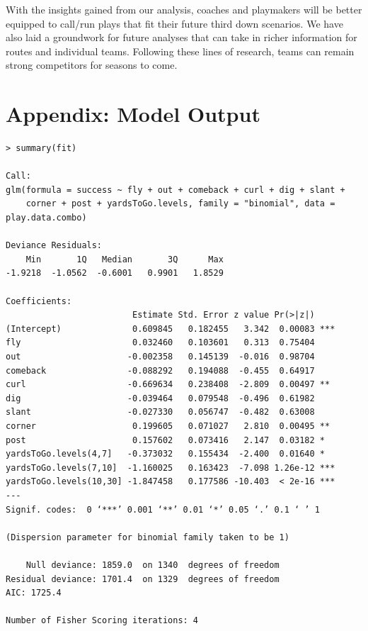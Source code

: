 \documentclass[12pt,letterpaper]{article}
\begin{document}
With the insights gained from our analysis, coaches and playmakers will be better equipped to call/run plays that fit their future third down scenarios. We have also laid a groundwork for future analyses that can take in richer information for routes and individual teams. Following these lines of research, teams can remain strong competitors for seasons to come.

\newpage

\section*{Appendix: Model Output}

\begin{lstlisting}[frame=single]
> summary(fit)

Call:
glm(formula = success ~ fly + out + comeback + curl + dig + slant + 
    corner + post + yardsToGo.levels, family = "binomial", data = play.data.combo)

Deviance Residuals: 
    Min       1Q   Median       3Q      Max  
-1.9218  -1.0562  -0.6001   0.9901   1.8529  

Coefficients:
                         Estimate Std. Error z value Pr(>|z|)    
(Intercept)              0.609845   0.182455   3.342  0.00083 ***
fly                      0.032460   0.103601   0.313  0.75404    
out                     -0.002358   0.145139  -0.016  0.98704    
comeback                -0.088292   0.194088  -0.455  0.64917    
curl                    -0.669634   0.238408  -2.809  0.00497 ** 
dig                     -0.039464   0.079548  -0.496  0.61982    
slant                   -0.027330   0.056747  -0.482  0.63008    
corner                   0.199605   0.071027   2.810  0.00495 ** 
post                     0.157602   0.073416   2.147  0.03182 *  
yardsToGo.levels(4,7]   -0.373032   0.155434  -2.400  0.01640 *  
yardsToGo.levels(7,10]  -1.160025   0.163423  -7.098 1.26e-12 ***
yardsToGo.levels(10,30] -1.847458   0.177586 -10.403  < 2e-16 ***
---
Signif. codes:  0 ‘***’ 0.001 ‘**’ 0.01 ‘*’ 0.05 ‘.’ 0.1 ‘ ’ 1

(Dispersion parameter for binomial family taken to be 1)

    Null deviance: 1859.0  on 1340  degrees of freedom
Residual deviance: 1701.4  on 1329  degrees of freedom
AIC: 1725.4

Number of Fisher Scoring iterations: 4

\end{lstlisting}
\end{document}
